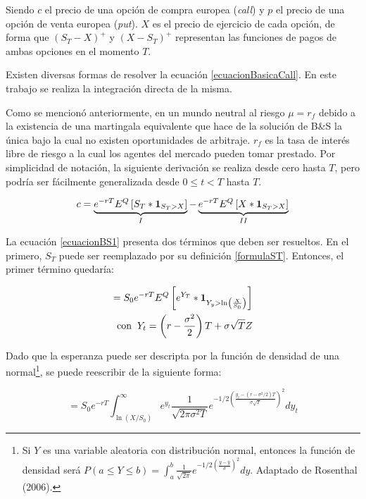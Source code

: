 Siendo $c$ el precio de una opción de compra europea (\textit{call}) y $p$ el precio de una opción de venta europea (\textit{put}). $X$ es el precio de ejercicio de cada opción, de forma que $(S_T-X)^+$ y $(X-S_T)^+$ representan las funciones de pagos de ambas opciones en el momento $T$.

Existen diversas formas de resolver la ecuación \eqref{ecuacionBasicaCall}\cite{frouah-formula}. En este trabajo se realiza la integración directa de la misma.

Como se mencionó anteriormente, en un mundo neutral al riesgo $ \mu = r_f $ debido a la existencia de una martingala equivalente que hace de la solución de B\&S la única bajo la cual no existen oportunidades de arbitraje. $ r_f $ es la tasa de interés libre de riesgo a la cual los agentes del mercado pueden tomar prestado. Por simplicidad de notación, la siguiente derivación se realiza desde cero hasta $T$, pero podría ser fácilmente generalizada desde $0 \leq t < T$ hasta $T$.

\begin{equation}
	c = \underbrace{ e^{-r T} E^Q\left[S_T * \mathbf{1}_{S_T > X}\right] }_{I} - 
	    \underbrace{ e^{-r T}E^Q\left[X * \mathbf{1}_{S_T > X}\right] }_{II} \label{ecuacionBS1}
\end{equation}

La ecuación \eqref{ecuacionBS1} presenta dos términos que deben ser resueltos. En el primero, $ S_T $ puede ser reemplazado por su definición \eqref{formulaST}. Entonces, el primer término quedaría:


\begin{align}
	= S_0 e^{-r T} E^Q\left[e^{Y_T} * \mathbf{1}_{Y_y > \ln \left( \frac{X}{S_0} \right)} \right] \\
	\mathrm{con}\;\; Y_t = \left(r-\frac{\sigma^2}{2}\right) T + \sigma \sqrt{T} Z
\end{align}

Dado que la esperanza puede ser descripta por la función de densidad de una 
normal\footnote{Si $Y$ es una variable aleatoria con distribución normal, entonces la función de densidad será $ P(a \leq Y \leq b) = \int_a^b{\frac{1}{\sqrt{2\pi}} e^{-1/2 (\frac{y-\overline{y}}{\sigma})^2} dy} $. Adaptado de Rosenthal (2006).}, 
se puede reescribir de la siguiente forma:

\begin{equation}
	= S_0 e^{-r T} \int_{\ln(X/S_0)}^\infty{e^{y_t} \frac{1}{\sqrt{2 \pi \sigma^2 T}} 
		e^{-1/2 \left( \tfrac{y_t - (r - \sigma^2/2) T}{\sigma \sqrt{T}} \right)^2 } dy_t}
\end{equation}

